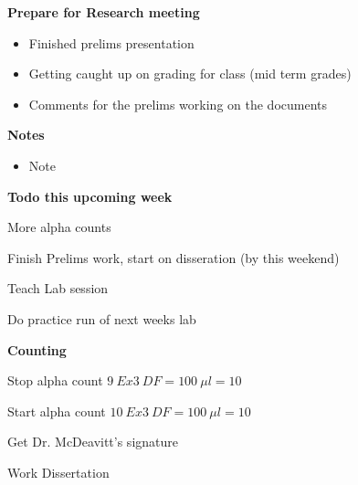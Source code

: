 \documentclass[idxtotoc,hyperref,openany,oneside]{labbook} %
\begin{document}
\textbf{Prepare for Research meeting}
\begin{itemize}
\item{Finished prelims presentation}
\item{Getting caught up on grading for class (mid term grades)}
\item{Comments for the prelims working on the documents}
\end{itemize}
\textbf{Notes}
\begin{itemize}
\item{Note}
\vspace{2cm}
\end{itemize}
\textbf{Todo this upcoming week}
\begin{todolist}
\item{More alpha counts}
\item{Finish Prelims work, start on disseration (by this weekend)}
\vspace{2cm}
\end{todolist}






\begin{todolist}
\item{Teach Lab session}
\item{Do practice run of next weeks lab}
\end{todolist}

\textbf{Counting}
\begin{todolist}
\item{Stop alpha count $\boxed{9\ Ex3\ DF=100\ \mu l=10}$}
\item{Start alpha count $\boxed{10\ Ex3\ DF=100\ \mu l=10}$}
\end{todolist}


\begin{todolist}
\item{Get Dr. McDeavitt's signature}
\item{Work Dissertation}
\end{todolist}


\end{document}
